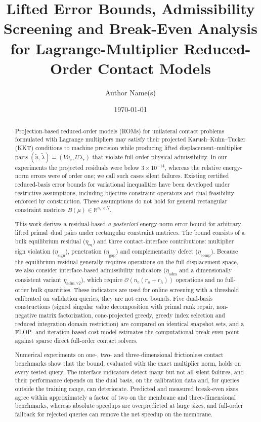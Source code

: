 \documentclass[11pt,a4paper]{article}
\title{Lifted Error Bounds, Admissibility Screening and Break-Even Analysis for Lagrange-Multiplier Reduced-Order Contact Models}
\author{Author Name(s)}
\date{\today}
\begin{document}
\maketitle

\begin{abstract}
Projection-based reduced-order models (ROMs) for unilateral contact problems formulated with Lagrange multipliers may satisfy their projected Karush--Kuhn--Tucker (KKT) conditions to machine precision while producing lifted displacement--multiplier pairs $(\tilde{u}, \tilde{\lambda}) = (V u_r, U \lambda_r)$ that violate full-order physical admissibility. In our experiments the projected residuals were below $3 \times 10^{-14}$, whereas the relative energy-norm errors were of order one; we call such cases silent failures. Existing certified reduced-basis error bounds for variational inequalities have been developed under restrictive assumptions, including bijective constraint operators and dual feasibility enforced by construction. These assumptions do not hold for general rectangular constraint matrices $B(\mu) \in \mathbb{R}^{n_c \times N}$.

This work derives a residual-based \emph{a posteriori} energy-norm error bound for arbitrary lifted primal--dual pairs under rectangular constraint matrices. The bound consists of a bulk equilibrium residual ($\eta_{\mathrm{eq}}$) and three contact-interface contributions: multiplier sign violation ($\eta_{\mathrm{sign}}$), penetration ($\eta_{\mathrm{gap}}$) and complementarity defect ($\eta_{\mathrm{comp}}$). Because the equilibrium residual generally requires operations on the full displacement space, we also consider interface-based admissibility indicators ($\eta_{\mathrm{adm}}$ and a dimensionally consistent variant $\eta_{\mathrm{adm,v2}}$), which require $\mathcal{O}(n_c (r_u + r_\lambda))$ operations and no full-order bulk quantities. These indicators are used for online screening with a threshold calibrated on validation queries; they are not error bounds. Five dual-basis constructions (signed singular value decomposition with primal rank repair, non-negative matrix factorization, cone-projected greedy, greedy index selection and reduced integration domain restriction) are compared on identical snapshot sets, and a FLOP- and iteration-based cost model estimates the computational break-even point against sparse direct full-order contact solvers.

Numerical experiments on one-, two- and three-dimensional frictionless contact benchmarks show that the bound, evaluated with the exact multiplier norm, holds on every tested query. The interface indicators detect many but not all silent failures, and their performance depends on the dual basis, on the calibration data and, for queries outside the training range, can deteriorate. Predicted and measured break-even sizes agree within approximately a factor of two on the membrane and three-dimensional benchmarks, whereas absolute speedups are overpredicted at large sizes, and full-order fallback for rejected queries can remove the net speedup on the membrane.
\end{abstract}
\end{document}
